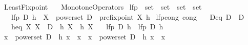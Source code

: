 %
\begin{isabellebody}%
%
%
\isadelimdocument
%
\endisadelimdocument
%
\isatagdocument
\isanewline
%
\isamarkuptrue%
%
\endisatagdocument
{\isafolddocument}%
%
\isadelimdocument
%
\endisadelimdocument
%
\isadelimtheory
%
\endisadelimtheory
%
\isatagtheory
{}\isamarkupfalse%
\ Least{\isacharunderscore}{\kern0pt}Fixpoint\isanewline
\ \ \ Monotone{\isacharunderscore}{\kern0pt}Operators\isanewline
{}%
\endisatagtheory
{\isafoldtheory}%
%
\isadelimtheory
%
\endisadelimtheory
%
\isadelimdocument
%
\endisadelimdocument
%
\isatagdocument
%
\isamarkuptrue%
%
\endisatagdocument
{\isafolddocument}%
%
\isadelimdocument
%
\endisadelimdocument
{}\isamarkupfalse%
\ lfp\ {\isacharcolon}{\kern0pt}{\isacharcolon}{\kern0pt}\ {\isachardoublequoteopen}set\ {\isasymRightarrow}\ {\isacharparenleft}{\kern0pt}set\ {\isasymRightarrow}\ set{\isacharparenright}{\kern0pt}\ {\isasymRightarrow}\ set{\isachardoublequoteclose}\isanewline
\ \ \ {\isachardoublequoteopen}lfp\ D\ h\ {\isasymequiv}\ {\isasymInter}{\isacharbraceleft}{\kern0pt}X\ {\isasymin}\ powerset\ D\ {\isacharbar}{\kern0pt}\ prefixpoint\ X\ h{\isacharbraceright}{\kern0pt}{\isachardoublequoteclose}\isanewline
\isanewline
{}\isamarkupfalse%
\ lfp{\isacharunderscore}{\kern0pt}cong\ {\isacharbrackleft}{\kern0pt}cong{\isacharbrackright}{\kern0pt}{\isacharcolon}{\kern0pt}\isanewline
\ \ \ D{\isacharunderscore}{\kern0pt}eq{\isacharcolon}{\kern0pt}\ {\isachardoublequoteopen}D\ {\isacharequal}{\kern0pt}\ D{\isacharprime}{\kern0pt}{\isachardoublequoteclose}\isanewline
\ \ \ h{\isacharunderscore}{\kern0pt}eq{\isacharcolon}{\kern0pt}\ {\isachardoublequoteopen}{\isasymAnd}X{\isachardot}{\kern0pt}\ X\ {\isasymsubseteq}\ D{\isacharprime}{\kern0pt}\ {\isasymLongrightarrow}\ h\ X\ {\isacharequal}{\kern0pt}\ h{\isacharprime}{\kern0pt}\ X{\isachardoublequoteclose}\isanewline
\ \ \ {\isachardoublequoteopen}lfp\ D\ h\ {\isacharequal}{\kern0pt}\ lfp\ D{\isacharprime}{\kern0pt}\ h{\isacharprime}{\kern0pt}{\isachardoublequoteclose}\isanewline
%
\isadelimproof
%
\endisadelimproof
%
\isatagproof
{}\isamarkupfalse%
\ {\isacharminus}{\kern0pt}\isanewline
\ \ \isamarkupfalse%
\ {\isachardoublequoteopen}{\isacharbraceleft}{\kern0pt}x\ {\isasymin}\ powerset\ D\ {\isacharbar}{\kern0pt}\ h\ x\ {\isasymsubseteq}\ x{\isacharbraceright}{\kern0pt}\ {\isacharequal}{\kern0pt}\ {\isacharbraceleft}{\kern0pt}x\ {\isasymin}\ powerset\ D{\isacharprime}{\kern0pt}\ {\isacharbar}{\kern0pt}\ h{\isacharprime}{\kern0pt}\ x\ {\isasymsubseteq}\ x{\isacharbraceright}{\kern0pt}{\isachardoublequoteclose}\isanewline

\end{isabellebody}
